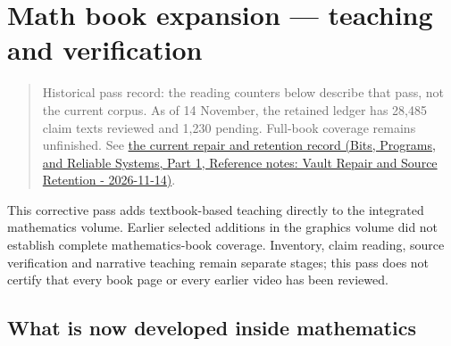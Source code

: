 \hypertarget{appendix-5056f3debc1f}{}\label{referencestart:appendix-5056f3debc1f}
\section{Math book expansion --- teaching and verification}\label{appendix-5056f3debc1f-math-book-expansion-teaching-and-verification}

\hypertarget{appendix-5056f3debc1f-math-book-expansion-teaching-and-verification}{}

\begin{quote}
Historical pass record: the reading counters below describe that pass, not the current corpus. As of 14 November, the retained ledger has 28,485 claim texts reviewed and 1,230 pending. Full-book coverage remains unfinished. See \href{../01-Bits-Programs-and-Reliable-Systems-P01/main.pdf\#nameddest=appendix-faa2b5a8e820}{the current repair and retention record (Bits, Programs, and Reliable Systems, Part 1, Reference notes: Vault Repair and Source Retention - 2026-11-14)}.
\end{quote}

This corrective pass adds textbook-based teaching directly to the integrated mathematics volume. Earlier selected additions in the graphics volume did not establish complete mathematics-book coverage. Inventory, claim reading, source verification and narrative teaching remain separate stages; this pass does not certify that every book page or every earlier video has been reviewed.

\subsection{What is now developed inside mathematics}\label{appendix-5056f3debc1f-what-is-now-developed-inside-mathematics}

\hypertarget{appendix-5056f3debc1f-what-is-now-developed-inside-mathematics}{}

